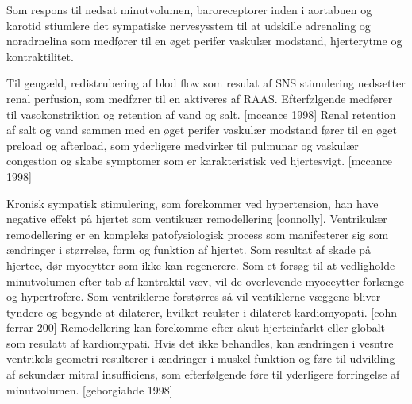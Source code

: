 Som respons til nedsat minutvolumen, baroreceptorer inden i aortabuen og karotid stiumlere det sympatiske nervesysstem til at udskille adrenaling og noradrnelina som medfører til en øget perifer vaskulær modstand, hjerterytme og kontraktilitet. 

Til gengæld, redistrubering af blod flow som resulat af SNS stimulering nedsætter renal perfusion, som medfører til en aktiveres af RAAS. Efterfølgende medfører til vasokonstriktion og retention af vand og salt. [mccance 1998] Renal retention af salt og vand sammen med en øget perifer vaskulær modstand fører til en øget preload og afterload, som yderligere medvirker til pulmunar og vaskulær congestion og skabe symptomer som er karakteristisk ved hjertesvigt. [mccance 1998]

Kronisk sympatisk stimulering, som forekommer ved hypertension, han have negative effekt på hjertet som ventikuær remodellering [connolly]. 
Ventrikulær remodellering er en kompleks patofysiologisk process som manifesterer sig som ændringer i størrelse, form og funktion af hjertet. Som resultat af skade på hjertee, dør myocytter som ikke kan regenerere. Som et forsøg til at vedligholde minutvolumen efter tab af kontraktil væv, vil de overlevende myoceytter forlænge og hypertrofere. Som ventriklerne forstørres så vil ventiklerne væggene bliver tyndere og begynde at dilaterer, hvilket reulster i dilateret kardiomyopati. [cohn ferrar 200] Remodellering kan forekomme efter akut hjerteinfarkt eller globalt som resulatt af kardiomypati. Hvis det ikke behandles, kan ændringen i vesntre ventrikels geometri resulterer i ændringer i muskel funktion og føre til udvikling af sekundær mitral insufficiens, som efterfølgende føre til yderligere forringelse af minutvolumen. [gehorgiahde 1998]


